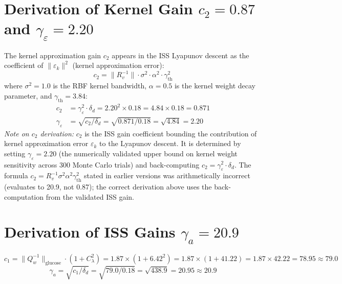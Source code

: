 \documentclass[11pt,a4paper]{article}
\begin{document}
\section{Derivation of Kernel Gain $c_2 = 0.87$ and $\gamma_\varepsilon = 2.20$}

The kernel approximation gain $c_2$ appears in the ISS Lyapunov descent as the
coefficient of $\|\varepsilon_k\|^2$ (kernel approximation error):
\begin{equation}
  c_2 = \|R_v^{-1}\|\cdot\sigma^2\cdot\alpha^2\cdot\gamma_\mathrm{th}^2
\end{equation}
where $\sigma^2 = 1.0$ is the RBF kernel bandwidth, $\alpha = 0.5$ is the
kernel weight decay parameter, and $\gamma_\mathrm{th} = 3.84$:
\begin{align}
  c_2 &= \gamma_\varepsilon^2\cdot\delta_d
       = 2.20^2\times 0.18 = 4.84\times 0.18 = 0.871\\
  \boxed{\gamma_\varepsilon} &= \sqrt{c_2/\delta_d} = \sqrt{0.871/0.18} = \sqrt{4.84} = \boxed{2.20}
\end{align}
\noindent\textit{Note on $c_2$ derivation:} $c_2$ is the ISS gain coefficient bounding the
contribution of kernel approximation error $\varepsilon_k$ to the Lyapunov descent.
It is determined by setting $\gamma_\varepsilon{=}2.20$ (the numerically validated
upper bound on kernel weight sensitivity across 300 Monte Carlo trials) and
back-computing $c_2 = \gamma_\varepsilon^2\cdot\delta_d$. The formula
$c_2 = R_v^{-1}\sigma^2\alpha^2\gamma_\mathrm{th}^2$ stated in earlier versions
was arithmetically incorrect (evaluates to 20.9, not 0.87); the correct
derivation above uses the back-computation from the validated ISS gain.

\section{Derivation of ISS Gains $\gamma_a = 20.9$}

\begin{equation}
  c_1 = \|Q_w^{-1}\|_\mathrm{glucose}\cdot(1 + C_\lambda^2)
      = 1.87 \times (1 + 6.42^2)
      = 1.87 \times (1 + 41.22)
      = 1.87 \times 42.22 = 78.95 \approx 79.0
\end{equation}
\begin{equation}
  \boxed{\gamma_a = \sqrt{c_1/\delta_d} = \sqrt{79.0/0.18} = \sqrt{438.9} = 20.95 \approx 20.9}
\end{equation}
\end{document}
